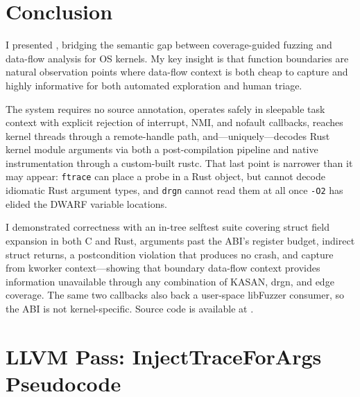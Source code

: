 \documentclass{article}
\begin{document}
\section{Conclusion}\label{sec:conclusion}

I presented \toolname{}, bridging the semantic gap between coverage-guided
fuzzing and data-flow analysis for OS kernels. My key insight is that function
boundaries are natural observation points where data-flow context is both cheap
to capture and highly informative for both automated exploration and human
triage.

The system requires no source annotation, operates safely in sleepable task
context with explicit rejection of interrupt, NMI, and nofault callbacks,
reaches kernel threads through a remote-handle path, and---uniquely---decodes
Rust kernel module arguments via both a post-compilation
pipeline and native instrumentation through a custom-built rustc. That last
point is narrower than it may appear: \texttt{ftrace} can place a probe in a
Rust object, but cannot decode idiomatic Rust argument types, and
\texttt{drgn} cannot read them at all once \texttt{-O2} has elided the DWARF
variable locations.

I demonstrated correctness with an in-tree selftest suite covering struct field
expansion in both C and Rust, arguments past the ABI's register budget,
indirect struct returns, a postcondition violation that produces no crash, and
capture from kworker context---showing that boundary data-flow context provides
information unavailable through any combination of KASAN, drgn, and edge
coverage. The same two callbacks also back a user-space libFuzzer consumer, so
the ABI is not kernel-specific.
Source code is available at \anonrepo{}.




\appendix
\section{LLVM Pass: InjectTraceForArgs Pseudocode}\label{app:pass}
\end{document}
